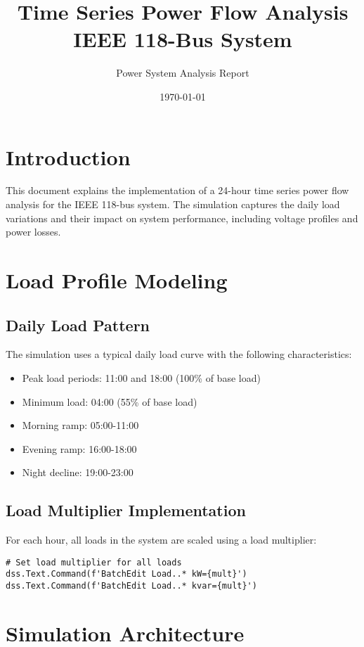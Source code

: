 \documentclass[11pt]{article}
\title{Time Series Power Flow Analysis\\IEEE 118-Bus System}
\author{Power System Analysis Report}
\date{\today}
\begin{document}
\maketitle

\section{Introduction}
This document explains the implementation of a 24-hour time series power flow analysis for the IEEE 118-bus system. The simulation captures the daily load variations and their impact on system performance, including voltage profiles and power losses.

\section{Load Profile Modeling}

\subsection{Daily Load Pattern}
The simulation uses a typical daily load curve with the following characteristics:
\begin{itemize}
    \item Peak load periods: 11:00 and 18:00 (100\% of base load)
    \item Minimum load: 04:00 (55\% of base load)
    \item Morning ramp: 05:00-11:00
    \item Evening ramp: 16:00-18:00
    \item Night decline: 19:00-23:00
\end{itemize}

\subsection{Load Multiplier Implementation}
For each hour, all loads in the system are scaled using a load multiplier:
\begin{lstlisting}[caption=Load Scaling Implementation]
# Set load multiplier for all loads
dss.Text.Command(f'BatchEdit Load..* kW={mult}')
dss.Text.Command(f'BatchEdit Load..* kvar={mult}')
\end{lstlisting}

\section{Simulation Architecture}
\end{document}
